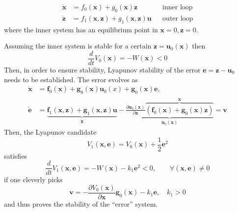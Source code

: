 \noindent\begin{align*}
    \dot{\mathbf{x}} & = f_0(\mathbf{x}) + g_0(\mathbf{x})\mathbf{z}                         &  & \text{inner loop} \\
    \dot{\mathbf{z}} & = f_1(\mathbf{x},\mathbf{z}) + g_1(\mathbf{x}, \mathbf{z}) \mathbf{u} &  & \text{outer loop}
\end{align*}
where the inner system has an equilibrium point in $\mathbf{x}=0, \mathbf{z}=0$.

\newpar{}
Assuming the inner system is stable for a certain $\mathbf{z} = \mathbf{u}_0(\mathbf{x})$ then
\noindent\begin{equation*}
    \frac{d}{dt} V_0(\mathbf{x}) = -W(\mathbf{x}) < 0
\end{equation*}
Then, in order to ensure stability, Lyapunov stability of the error $\mathbf{e} = \mathbf{z}-\mathbf{u}_0$ needs to be established.
The error evolves as
\begin{align*}
    \dot{\mathbf{x}} & =\mathbf{f}_{0}(\mathbf{x})+\mathbf{g}_{0}(\mathbf{x})\mathbf{u}_{0}(x)+\mathbf{g}_{0}(\mathbf{x})\mathbf{e},                                                                                                                                                                                                                                              \\
    \dot{\mathbf{e}} & =\underbrace{\mathbf{f}_{1}(\mathbf{x},\mathbf{z})+\mathbf{g}_{1}(\mathbf{x},\mathbf{z})\mathbf{u}}_{\dot{\mathbf{z}}}-\underbrace{\frac{\partial \mathbf{u}_{0}(\mathbf{x})}{\partial \mathbf{x}}\overbrace{\left(\mathbf{f}_{0}(\mathbf{x})+\mathbf{g}_{0}(\mathbf{x})\mathbf{z}\right)}^{\dot{\mathbf{x}}}}_{\dot{\mathbf{u}}_0(\mathbf{x})}=\mathbf{v}
\end{align*}
Then, the Lyapunov candidate
\noindent\begin{equation*}
    V_1(\mathbf{x}, \mathbf{e}) = V_0(\mathbf{x})+\frac{1}{2} \mathbf{e}^2
\end{equation*}
satisfies
\noindent\begin{equation*}
    \frac{d}{dt}V_1(\mathbf{x}, \mathbf{e}) = -W(\mathbf{x}) - k_1 \mathbf{e}^2 <0 ,\qquad \forall(\mathbf{x},\mathbf{e}) \neq 0
\end{equation*}
if one cleverly picks
\begin{equation*}
    \mathbf{v}=-\frac{\partial V_0(\mathbf{x})}{\partial \mathbf{x}}\mathbf{g}_0(\mathbf{x})-k_1\mathbf{e},\quad k_1>0
\end{equation*}
and thus proves the stability of the ``error'' system.

